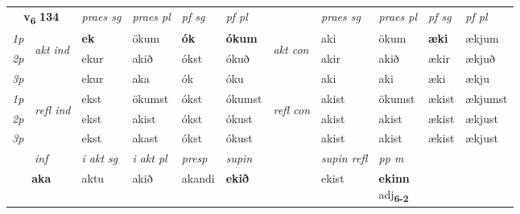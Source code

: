 \noindent
\begin{tabular}{lllllllllll} \toprule
\multicolumn{2}{c}{\textbf{v{\textsubscript{6}}} \Large{\textbf{134}}}  &  \textit{praes sg}  & \textit{praes pl}  &\textit{ pf sg} & \textit{pf pl} &  &  \textit{praes sg}  & \textit{praes pl}  & \textit{pf sg} & \textit{pf pl } \\*
	\cmidrule{3-6} \cmidrule{8-11}
 {\textit{1p}} & \multirow{3}{*}{\begin{turn}{90}\textit{akt ind}\end{turn}} & \textbf{ek} & ökum & \textbf{ók} & \textbf{ókum} & \multirow{3}{*}{\begin{turn}{90}\textit{akt con}\end{turn}} &aki & ökum & \textbf{æki} & ækjum\\*
 {\textit{2p}} &  &  ekur  & akið & ókst & ókuð & & akir & akið & ækir & ækjuð \\*
{\textit{3p}} &  & ekur & aka & ók & óku & & aki & aki& æki & ækju \\*
\cmidrule{3-6} \cmidrule{8-11}
 {\textit{1p}} & \multirow{3}{*}{\begin{turn}{90}\textit{refl ind}\end{turn}}  & ekst & ökumst & ókst & ókumst & \multirow{3}{*}{\begin{turn}{90}\textit{refl con}\end{turn}}  &akist & ökumst & ækist & ækjumst \\*
 {\textit{2p}} &  & ekst & akist & ókst & ókust & &akist & akist & ækist & ækjust \\*
 {\textit{3p}}  & & ekst & akast & ókst & ókust & & akist & akist& ækist & ækjust \\*
\cmidrule{3-6} \cmidrule{8-11}

   \multicolumn{2}{c}{\textit{inf}}  & \textit{i akt sg} & \textit{i akt pl}   & \textit{presp} & \textit{supin} && \textit{supin refl} & \textit{pp m} \\*
  \multicolumn{2}{c}{\textbf{aka}} & aktu  & akið   & akandi &  \textbf{ekið} && ekist & \specialcell{\textbf{ekinn} \\ adj\textbf{\textsubscript{6-2}}} \\*
\end{tabular}


